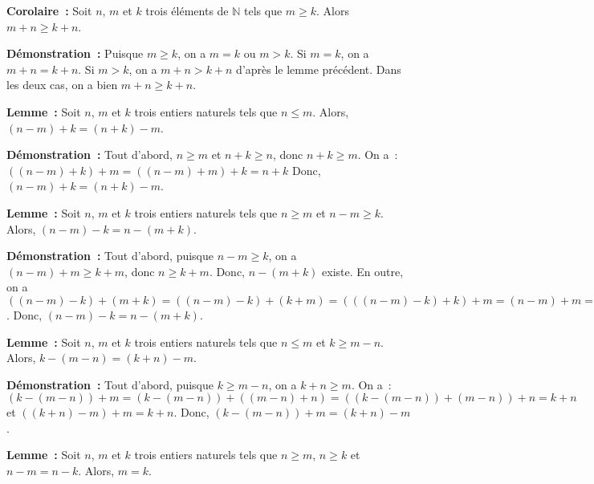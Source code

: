    \done 

\medskip

\noindent\textbf{Corolaire :} Soit $n$, $m$ et $k$ trois éléments de $\mathbb{N}$ tels que $m \geq k$. 
    Alors $m + n \geq k + n$.

\medskip

\noindent\textbf{Démonstration :} 
    Puisque $m \geq k$, on a $m = k$ ou $m > k$.
    Si $m = k$, on a $m + n = k + n$.
    Si $m > k$, on a $m + n > k + n$ d'après le lemme précédent.
    Dans les deux cas, on a bien $m + n \geq k + n$.

   \done 

\medskip

\noindent\textbf{Lemme :} Soit $n$, $m$ et $k$ trois entiers naturels tels que $n \leq m$.
    Alors, $(n-m) + k = (n+k) - m$.

\medskip

\noindent\textbf{Démonstration :} Tout d'abord, $n \geq m$ et $n+k \geq n$, donc $n+k \geq m$.
    On a : $((n-m)+k) + m = ((n-m) + m) + k = n + k$
    Donc, $(n-m)+k = (n+k) - m$.

    \done

\medskip

\noindent\textbf{Lemme :} Soit $n$, $m$ et $k$ trois entiers naturels tels que $n \geq m$ et $n-m \geq k$.
    Alors, $(n-m)-k = n-(m+k)$.

\medskip

\noindent\textbf{Démonstration :} Tout d'abord, puisque $n-m \geq k$, on a $(n-m) + m \geq k+m$, donc $n \geq k+m$.
    Donc, $n-(m+k)$ existe.
    En outre, on a $((n-m)-k) + (m+k) = ((n-m)-k) + (k+m) = (((n-m)-k)+k)+m = (n-m)+m = n$. 
    Donc, $(n-m)-k = n-(m+k)$.

    \done

\medskip

\noindent\textbf{Lemme :} Soit $n$, $m$ et $k$ trois entiers naturels tels que $n \leq m$ et $k \geq m-n$.
    Alors, $k - (m-n) = (k+n) - m$.

\medskip

\noindent\textbf{Démonstration :} Tout d'abord, puisque $k \geq m-n$, on a $k+n \geq m$.
    On a : $(k - (m-n)) + m = (k-(m-n)) + ((m-n) + n) = ((k-(m-n)) + (m-n))+n = k + n$
    et $((k+n)-m) + m = k + n$. 
    Donc, $(k - (m-n)) + m = (k+n) - m$.

   \done 

\medskip

\noindent\textbf{Lemme :} Soit $n$, $m$ et $k$ trois entiers naturels tels que $n \geq m$, $n \geq k$ et $n - m = n - k$.
    Alors, $m = k$.

